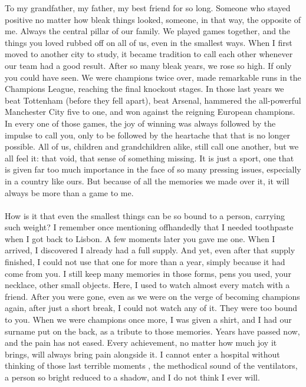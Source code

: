  To my grandfather, my father, my best friend for so long. Someone who stayed positive no matter how bleak things looked, someone, in that way, the opposite of me. Always the central pillar of our family. We played games together, and the things you loved rubbed off on all of us, even in the smallest ways. When I first moved to another city to study, it became tradition to call each other whenever our team had a good result. After so many bleak years, we rose so high. If only you could have seen. We were champions twice over, made remarkable runs in the Champions League, reaching the final knockout stages. In those last years we beat Tottenham (before they fell apart), beat Arsenal, hammered the all-powerful Manchester City five to one, and won against the reigning European champions. In every one of those games, the joy of winning was always followed by the impulse to call you, only to be followed by the heartache that that is no longer possible. All of us, children and grandchildren alike, still call one another, but we all feel it: that void, that sense of something missing. It is just a sport, one that is given far too much importance in the face of so many pressing issues, especially in a country like ours. But because of all the memories we made over it, it will always be more than a game to me.
 \\
 \\
 How is it that even the smallest things can be so bound to a person, carrying such weight? I remember once mentioning offhandedly that I needed toothpaste when I got back to Lisbon. A few moments later you gave me one. When I arrived, I discovered I already had a full supply. And yet, even after that supply finished, I could not use that one for more than a year, simply because it had come from you. I still keep many memories in those forms, pens you used, your necklace, other small objects. Here, I used to watch almost every match with a friend. After you were gone, even as we were on the verge of becoming champions again, after just a short break, I could not watch any of it. They were too bound to you. When we were champions once more, I was given a shirt, and I had our surname put on the back, as a tribute to those memories. Years have passed now, and the pain has not eased. Every achievement, no matter how much joy it brings, will always bring pain alongside it. I cannot enter a hospital without thinking of those last terrible moments , the methodical sound of the ventilators, a person so bright reduced to a shadow, and I do not think I ever will.
 \\
